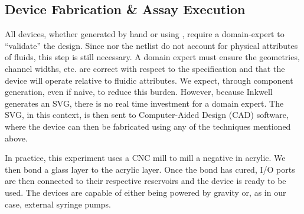 \subsection{Device Fabrication \& Assay Execution}
\label{sec:assay_execution}

All devices, whether generated by hand or using \tool{}, require a domain-expert to ``validate'' the design.
Since \bs{} nor the netlist do not account for physical attributes of fluids, this step is still necessary.
A domain expert must ensure the geometries, channel widths, etc. are correct with respect to the specification and that the device will operate relative to fluidic attributes.
We expect, through component generation, even if naive, to reduce this burden.
However, because Inkwell generates an SVG, there is no real time investment for a domain expert.
The SVG, in this context, is then sent to Computer-Aided Design (CAD) software, where the device can then be fabricated using any of the techniques mentioned above.

In practice, this experiment uses a CNC mill to mill a negative in acrylic.
We then bond a glass layer to the acrylic layer.
Once the bond has cured, I/O ports are then connected to their respective reservoirs and the device is ready to be used.
The devices are capable of either being powered by gravity or, as in our case, external syringe pumps.
